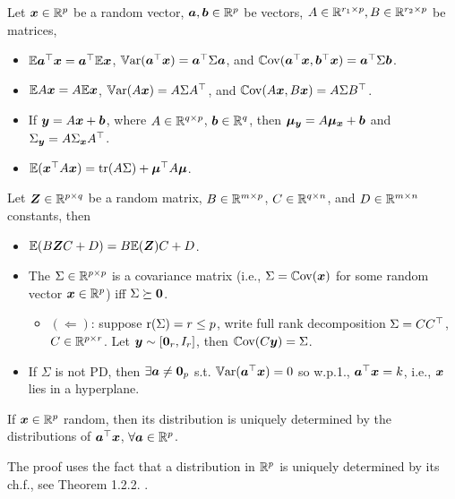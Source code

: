 \documentclass[10pt,a4paper]{book}
\begin{document}
\begin{thmbox}{}
	\begin{proposition}\label{prop:random_vector_moments}
		Let $\x\in\bbR^p$ be a random vector, $\a,\b\in\bbR^p$ be vectors, $A\in\bbR^{r_1\times p},B\in\bbR^{r_2\times p}$ be matrices,  
		\begin{itemize}
			\item $\bbE \a^\TT\x=\a^\TT \bbE\x$, $\Var(\a^\TT \x)=\a^\TT\Sigma\a$, and $\Cov(\a^\TT\x,\b^\TT\x)=\a^\TT \Sigma\b$.
			\item $\bbE A\x=A\bbE \x$, $\Var(A\x)=A\Sigma A^\TT$, and $\Cov(A\x,B\x)=A\Sigma B^\TT$.
			\item If $\y=A\x+\b$, where $A\in\bbR^{q\times p}$, $\b\in\bbR^{q}$, then $\bam_\y=A \bam_\x+\b$ and $\Sigma_\y=A\Sigma_\x A^\TT$.    
			\item $\bbE(\x^\TT A\x)=\tr(A\Sigma)+\bam^\TT A\bam$.  
		\end{itemize}  
		Let $\Z\in\bbR^{p\times q}$ be a random matrix, $B\in\bbR^{m\times p}$, $C\in\bbR^{q\times n}$, and $D\in\bbR^{m\times n}$ constants, then 
		\begin{itemize}
			\item $\bbE (B\Z C+D) = B \bbE (\Z) C+D$. 
		\end{itemize}   
	\end{proposition}
\end{thmbox}
\begin{itemize}
	\item The $\Sigma\in\bbR^{p\times p}$ is a covariance matrix (i.e., $\Sigma=\Cov(\x)$ for some random vector $\x\in\bbR^p$) iff $\Sigma\succeq \0$.
	\begin{itemize}
		\item \small $(\Leftarrow)$: suppose $\rmr(\Sigma)=r\leq p$, write full rank decomposition $\Sigma=C C^\TT$, $C\in\bbR^{p\times r}$. Let $\y\sim[\0_r,I_r]$, then $\Cov(C\y)=\Sigma$.    
	\end{itemize}
	\item If $\Sigma$ is not PD, then $\exists \a\neq\0_p$ s.t. $\Var(\a^\TT \x)=0$ so w.p.1., $\a^\TT \x=k$, i.e., $\x$ lies in a hyperplane.     
\end{itemize}

\begin{thmbox}{}
	\begin{theorem}\label{thm:rv_uni_linearFun}
		If $\x\in\bbR^p$ random, then its distribution is uniquely determined by the distributions of $\a^\TT \x$, $\forall \a\in\bbR^p$.  
	\end{theorem}
\end{thmbox}
The proof uses the fact that a distribution in $\bbR^p$ is uniquely determined by its ch.f., see Theorem 1.2.2. \cite{muirhead1982aspects}.
\end{document}

